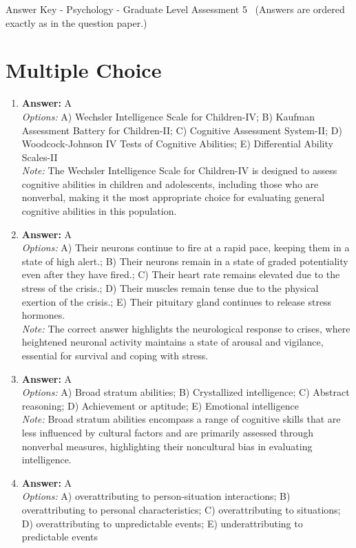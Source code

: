 \documentclass[12pt]{article}
\begin{document}
\begin{center}
Answer Key - Psychology - Graduate Level Assessment 5 \
\small (Answers are ordered exactly as in the question paper.)
\end{center}

\section*{Multiple Choice}
\begin{enumerate}[label=\arabic*.]
\item \textbf{Answer:} A
\\ \textit{Options:} A) Wechsler Intelligence Scale for Children-IV; B) Kaufman Assessment Battery for Children-II; C) Cognitive Assessment System-II; D) Woodcock-Johnson IV Tests of Cognitive Abilities; E) Differential Ability Scales-II
\\ \textit{Note:} The Wechsler Intelligence Scale for Children-IV is designed to assess cognitive abilities in children and adolescents, including those who are nonverbal, making it the most appropriate choice for evaluating general cognitive abilities in this population.
\item \textbf{Answer:} A
\\ \textit{Options:} A) Their neurons continue to fire at a rapid pace, keeping them in a state of high alert.; B) Their neurons remain in a state of graded potentiality even after they have fired.; C) Their heart rate remains elevated due to the stress of the crisis.; D) Their muscles remain tense due to the physical exertion of the crisis.; E) Their pituitary gland continues to release stress hormones.
\\ \textit{Note:} The correct answer highlights the neurological response to crises, where heightened neuronal activity maintains a state of arousal and vigilance, essential for survival and coping with stress.
\item \textbf{Answer:} A
\\ \textit{Options:} A) Broad stratum abilities; B) Crystallized intelligence; C) Abstract reasoning; D) Achievement or aptitude; E) Emotional intelligence
\\ \textit{Note:} Broad stratum abilities encompass a range of cognitive skills that are less influenced by cultural factors and are primarily assessed through nonverbal measures, highlighting their noncultural bias in evaluating intelligence.
\item \textbf{Answer:} A
\\ \textit{Options:} A) overattributing to person-situation interactions; B) overattributing to personal characteristics; C) overattributing to situations; D) overattributing to unpredictable events; E) underattributing to predictable events

\end{enumerate}
\end{document}
